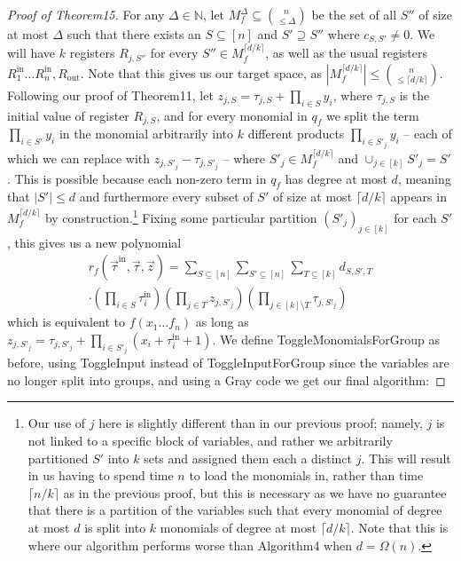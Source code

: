 \documentclass[10pt,a4paper]{article}
\begin{document}
\begin{proof}[Proof of Theorem15]
For any $\Delta\in\mathbb N$, let $M_f^{\Delta}\subseteq\binom n{\leq\Delta}$ be the set of all $S''$ of size at most $\Delta$ such that there exists an $S\subseteq[n]$ and $S'\supseteq S''$ where $c_{S,S'}\neq0$. We will have $k$ registers $R_{j,S''}$ for every $S''\in M_f^{\lceil d/k\rceil}$, as well as the usual registers $R_1^{\mathrm{in}}\ldots R_n^{\mathrm{in}},R_{\mathrm{out}}$. Note that this gives us our target space, as $|M_f^{\lceil d/k\rceil}|\leq\binom n{\leq\lceil d/k\rceil}$.
Following our proof of Theorem11, let $z_{j,S}=\tau_{j,S}+\prod_{i\in S}y_i$, where $\tau_{j,S}$ is the initial value of register $R_{j,S}$, and for every monomial in $q_f$ we split the term $\prod_{i\in S'}y_i$ in the monomial arbitrarily into $k$ different products $\prod_{i\in S'_j}y_i$ – each of which we can replace with $z_{j,S'_j}-\tau_{j,S'_j}$ – where $S'_j\in M_f^{\lceil d/k\rceil}$ and $\cup_{j\in[k]}S'_j=S'$. This is possible because each non-zero term in $q_f$ has degree at most $d$, meaning that $|S'|\leq d$ and furthermore every subset of $S'$ of size at most $\lceil d/k\rceil$ appears in $M_f^{\lceil d/k\rceil}$ by construction.\footnote{Our use of $j$ here is slightly different than in our previous proof; namely, $j$ is not linked to a specific block of variables, and rather we arbitrarily partitioned $S'$ into $k$ sets and assigned them each a distinct $j$. This will result in us having to spend time $n$ to load the monomials in, rather than time $\lceil n/k\rceil$ as in the previous proof, but this is necessary as we have no guarantee that there is a partition of the variables such that every monomial of degree at most $d$ is split into $k$ monomials of degree at most $\lceil d/k\rceil$. Note that this is where our algorithm performs worse than Algorithm4 when $d=\Omega(n)$.}
Fixing some particular partition $(S'_j)_{j\in[k]}$ for each $S'$, this gives us a new polynomial
\begin{multline*}
r_f(\vec\tau^{\mathrm{in}},\vec\tau,\vec z)=\sum_{S\subseteq[n]}\sum_{S'\subseteq[n]}\sum_{T\subseteq[k]}d_{S,S',T}\\
\cdot\left(\prod_{i\in S}\tau_i^{\mathrm{in}}\right)\left(\prod_{j\in T}z_{j,S'_j}\right)\left(\prod_{j\in[k]\setminus T}\tau_{j,S'_j}\right)
\end{multline*}
which is equivalent to $f(x_1\ldots f_n)$ as long as $z_{j,S'_j}=\tau_{j,S'_j}+\prod_{i\in S'_j}(x_i+\tau_i^{\mathrm{in}}+1)$. We define ToggleMonomialsForGroup as before, using ToggleInput instead of ToggleInputForGroup since the variables are no longer split into groups, and using a Gray code we get our final algorithm:

\end{proof}
\end{document}
